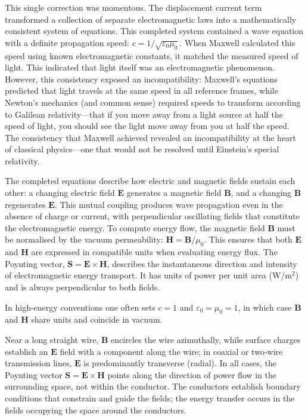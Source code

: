 This single correction was momentous. The displacement current term transformed a collection of separate electromagnetic laws into a mathematically consistent system of equations. This completed system contained a wave equation with a definite propagation speed: $c = 1/\sqrt{\varepsilon_0 \mu_0}$. When Maxwell calculated this speed using known electromagnetic constants, it matched the measured speed of light. This indicated that light itself was an electromagnetic phenomenon. However, this consistency exposed an incompatibility: Maxwell's equations predicted that light travels at the same speed in all reference frames, while Newton's mechanics (and common sense) required speeds to transform according to Galilean relativity—that if you move away from a light source at half the speed of light, you should see the light move away from you at half the speed. The consistency that Maxwell achieved revealed an incompatibility at the heart of classical physics—one that would not be resolved until Einstein's special relativity.

The completed equations describe how electric and magnetic fields sustain each other: a changing electric field $\mathbf{E}$ generates a magnetic field $\mathbf{B}$, and a changing $\mathbf{B}$ regenerates $\mathbf{E}$. This mutual coupling produces wave propagation even in the absence of charge or current, with perpendicular oscillating fields that constitute the electromagnetic energy. To compute energy flow, the magnetic field $\mathbf{B}$ must be normalised by the vacuum permeability: $\mathbf{H} = \mathbf{B} / \mu_0$. This ensures that both $\mathbf{E}$ and $\mathbf{H}$ are expressed in compatible units when evaluating energy flux. The Poynting vector, $\mathbf{S} = \mathbf{E} \times \mathbf{H}$, describes the instantaneous direction and intensity of electromagnetic energy transport. It has units of power per unit area (W/m$^2$) and is always perpendicular to both fields.

In high-energy conventions one often sets $c=1$ and $\varepsilon_0=\mu_0=1$, in which case $\mathbf{B}$ and $\mathbf{H}$ share units and coincide in vacuum.

Near a long straight wire, $\mathbf{B}$ encircles the wire azimuthally, while surface charges establish an $\mathbf{E}$ field with a component along the wire; in coaxial or two‑wire transmission lines, $\mathbf{E}$ is predominantly transverse (radial). In all cases, the Poynting vector $\mathbf{S}=\mathbf{E}\times\mathbf{H}$ points along the direction of power flow in the surrounding space, not within the conductor. The conductors establish boundary conditions that constrain and guide the fields; the energy transfer occurs in the fields occupying the space around the conductors.

